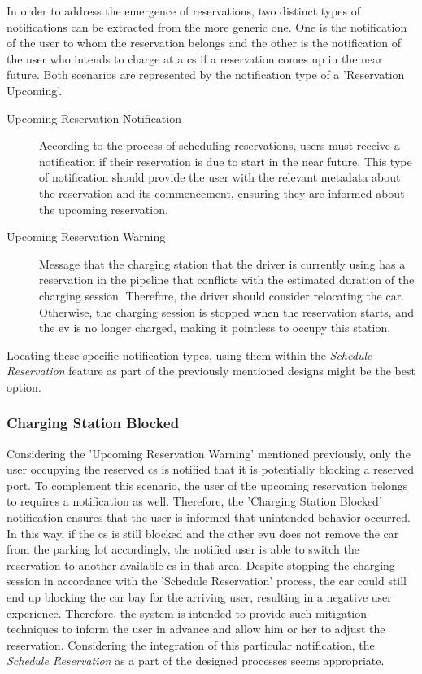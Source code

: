 In order to address the emergence of reservations, two distinct types of notifications can be extracted from the more generic one. One is the notification of the user to whom the reservation belongs and the other is the notification of the user who intends to charge at a \acrshort{cs} if a reservation comes up in the near future. 
Both scenarios are represented by the notification type of a 'Reservation Upcoming'.

\begin{description}
    \item[Upcoming Reservation Notification] According to the process of scheduling reservations, users must receive a notification if their reservation is due to start in the near future. This type of notification should provide the user with the relevant metadata about the reservation and its commencement, ensuring they are informed about the upcoming reservation.
    \item[Upcoming Reservation Warning] Message that the charging station that the driver is currently using has a reservation in the pipeline that conflicts with the estimated duration of the charging session. Therefore, the driver should consider relocating the car. Otherwise, the charging session is stopped when the reservation starts, and the \acrshort{ev} is no longer charged, making it pointless to occupy this station.
\end{description}

\noindent Locating these specific notification types, using them within the \textit{Schedule Reservation} feature as part of the previously mentioned designs might be the best option.

\subsubsection{Charging Station Blocked}
\label{ch:Design:sec:Reservation System:ssec:Notification Capabilities:sssec:Charging Station Blocked}

Considering the 'Upcoming Reservation Warning' mentioned previously, only the user occupying the reserved \acrshort{cs} is notified that it is potentially blocking a reserved port. To complement this scenario, the user of the upcoming reservation belongs to requires a notification as well.
Therefore, the 'Charging Station Blocked' notification ensures that the user is informed that unintended behavior occurred. In this way, if the \acrshort{cs} is still blocked and the other \acrshort{evu} does not remove the car from the parking lot accordingly, the notified user is able to switch the reservation to another available \acrshort{cs} in that area.
Despite stopping the charging session in accordance with the 'Schedule Reservation' process, the car could still end up blocking the car bay for the arriving user, resulting in a negative user experience. Therefore, the system is intended to provide such mitigation techniques to inform the user in advance and allow him or her to adjust the reservation.
Considering the integration of this particular notification, the \textit{Schedule Reservation} as a part of the designed processes seems appropriate.

